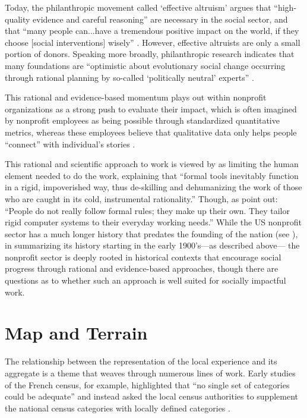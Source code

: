 Today, the philanthropic movement called ‘effective altruism’ argues that “high-quality evidence and careful reasoning” are necessary in the social sector, and that “many people can...have a tremendous positive impact on the world, if they choose [social interventions] wisely” \citep{EffectiveAltruismIntro}. However, effective altruists are only a small portion of donors. Speaking more broadly, philanthropic research indicates that many foundations are “optimistic about evolutionary social change occurring through rational planning by so-called ‘politically neutral’ experts” \citep{Arnove2007Revisiting}.

This rational and evidence-based momentum plays out within nonprofit organizations as a strong push to evaluate their impact, which is often imagined by nonprofit employees as being possible through standardized quantitative metrics, whereas these employees believe that qualitative data only helps people “connect” with individual’s stories \citep{Verma2016DrillDown}.

This rational and scientific approach to work is viewed by \cite{Berg1997OfForms} as limiting the human element needed to do the work, explaining that “formal tools inevitably function in a rigid, impoverished way, thus de-skilling and dehumanizing the work of those who are caught in its cold, instrumental rationality.” Though, as \cite{Bowker2000Sorting} point out: “People do not really follow formal rules; they make up their own. They tailor rigid computer systems to their everyday working needs.” While the US nonprofit sector has a much longer history that predates the founding of the nation (see \citet{Hall2006History}), in summarizing its history starting in the early 1900's---as described above--- the nonprofit sector is deeply rooted in historical contexts that encourage social progress through rational and evidence-based approaches, though there are questions as to whether such an approach is well suited for socially impactful work.

\section{Map and Terrain}
The relationship between the representation of the local experience and its aggregate is a theme that weaves through numerous lines of work. Early studies of the French census, for example, highlighted that “no single set of categories could be adequate” and instead asked the local census authorities to supplement the national census categories with locally defined categories \citep{Porter1995Trust}.

